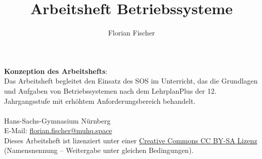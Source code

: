 \documentclass[12pt, a4paper]{article}
\author{Florian Fischer}
\title{Arbeitsheft Betriebssysteme}
\begin{document}
\pagestyle{empty}

\pagecolor{bgcolor}\afterpage{\nopagecolor}
{}


\pagestyle{fancy}

\tableofcontents
\vfill{}
{
\onehalfspacing
\setlength\parindent{0pt}
\textbf{\large Konzeption des Arbeitshefts}: \\[0.3cm]

Das Arbeitsheft begleitet den Einsatz des \gls{SOS} im Unterricht, das die Grundlagen und Aufgaben von Betriebssystemen nach dem LehrplanPlus der 12. Jahrgangsstufe mit erhöhtem Anforderungsbereich behandelt. \\[0.2cm]

\textbf{\theauthor} \\
Hans-Sachs-Gymnasium Nürnberg \\
E-Mail: \href{mailto:florian.fischer@muhq.space}{florian.fischer@muhq.space} \\[0.2cm]

Dieses Arbeitsheft ist lizenziert unter einer \href{https://creativecommons.org/licenses/by-sa/4.0/}{Creative Commons CC BY-SA Lizenz} (Namensnennung – Weitergabe unter gleichen Bedingungen).
}
\end{document}
